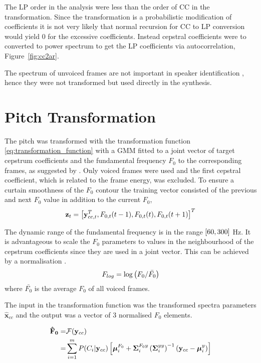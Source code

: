 The LP order in the analysis were less than the order of CC in the transformation. Since the transformation is a probabilistic modification of coefficients it is not very likely that normal recursion for CC to LP conversion would yield 0 for the excessive coefficients. Instead cepstral coefficients were to converted to power spectrum to get the LP coefficients via autocorrelation, Figure~\ref{fig:cc2ar}.

The spectrum of unvoiced frames are not important in speaker identification , hence they were not transformed but used directly in the synthesis.

\section{Pitch Transformation} %
\label{sec:pitch_transformation}

The pitch was transformed with the transformation function \eqref{eq:transformation_function} with a GMM fitted to a joint vector of target cepstrum coefficients and the fundamental frequency $F_0$ to the corresponding frames, as suggested by \cite{najjary03new}. Only voiced frames were used and the first cepstral coefficient, which is related to the frame energy, was excluded. To ensure a curtain smoothness of the $F_0$ contour the training vector consisted of the previous and next $F_0$ value in addition to the current $F_0$,
\begin{equation}
	\mathbf{z}_t = \left[\mathbf{y}_{cc,t}^T, F_{0,t}(t-1), F_{0,t}(t), F_{0,t}(t+1)\right]^T 
\end{equation}

The dynamic range of the fundamental frequency is in the range $\left[60,300\right]$ Hz. It is advantageous to scale the $F_0$ parameters to values in the neighbourhood of the cepstrum coefficients since they are used in a joint vector. This can be achieved by a normalisation \cite{najjary03new}.
\begin{equation}
	F_{log} = \log \left(F_0/\bar{F_0}\right)
\end{equation}
where $\bar{F_0}$ is the average $F_0$ of all voiced frames.

The input in the transformation function was the transformed spectra parameters $\hat{\mathbf{x}}_{cc}$ and the output was a vector of 3 normalised $F_0$ elements.

\begin{equation}
	\label{eq:pitch_transformation}
	\begin{split}
		\mathbf{\hat{F}_0} =& \mathcal F(\mathbf{y}_{cc})\\
		=& \sum_{i=1}^{m}P(C_i \vert \mathbf{y}_{cc}) \left[\boldsymbol{\mu}_i^{F_0} + \mathbf{\Sigma}_i^{F_0y} \left(\mathbf{\Sigma}_i^{yy}\right)^{-1} (\mathbf{y}_{cc}-\boldsymbol{\mu}_i^y)\right]
	\end{split}
\end{equation}

